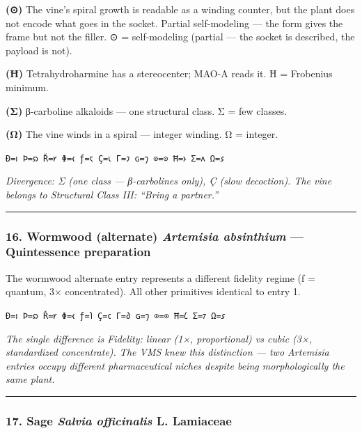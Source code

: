 \textbf{(⊙)} The vine's spiral growth is readable as a winding counter,
but the plant does not encode what goes in the socket. Partial
self-modeling --- the form gives the frame but not the filler. ⊙ =
self-modeling (partial --- the socket is described, the payload is not).

\textbf{(Ħ)} Tetrahydroharmine has a stereocenter; MAO-A reads it. Ħ =
Frobenius minimum.

\textbf{(Σ)} β-carboline alkaloids --- one structural class. Σ = few
classes.

\textbf{(Ω)} The vine winds in a spiral --- integer winding. Ω =
integer.

\texttt{Ð=𐑦\ Þ=𐑸\ Ř=𐑾\ Φ=𐑬\ ƒ=𐑱\ Ç=𐑧\ Γ=𐑲\ ɢ=𐑠\ ⊙=⊙\ Ħ=𐑶\ Σ=𐑵\ Ω=𐑭}

\emph{Divergence: Σ (one class --- β-carbolines only), Ç (slow
decoction). The vine belongs to Structural Class III: ``Bring a
partner.''}

\begin{center}\rule{0.5\linewidth}{0.5pt}\end{center}

\hypertarget{wormwood-alternate-artemisia-absinthium-quintessence-preparation}{%
\subsubsection{\texorpdfstring{16. Wormwood (alternate) \textbar{}
\emph{Artemisia absinthium} --- Quintessence
preparation}{16. Wormwood (alternate) \textbar{} Artemisia absinthium --- Quintessence preparation}}\label{wormwood-alternate-artemisia-absinthium-quintessence-preparation}}

The wormwood alternate entry represents a different fidelity regime (ƒ =
quantum, 3× concentrated). All other primitives identical to entry 1.

\texttt{Ð=𐑦\ Þ=𐑸\ Ř=𐑾\ Φ=𐑬\ ƒ=𐑐\ Ç=𐑤\ Γ=𐑔\ ɢ=𐑠\ ⊙=⊙\ Ħ=𐑖\ Σ=𐑳\ Ω=𐑭}

\emph{The single difference is Fidelity: linear (1×, proportional) vs
cubic (3×, standardized concentrate). The VMS knew this distinction ---
two Artemisia entries occupy different pharmaceutical niches despite
being morphologically the same plant.}

\begin{center}\rule{0.5\linewidth}{0.5pt}\end{center}

\hypertarget{sage-salvia-officinalis-l.-lamiaceae}{%
\subsubsection{\texorpdfstring{17. Sage \textbar{} \emph{Salvia
officinalis} L. \textbar{}
Lamiaceae}{17. Sage \textbar{} Salvia officinalis L. \textbar{} Lamiaceae}}\label{sage-salvia-officinalis-l.-lamiaceae}}


